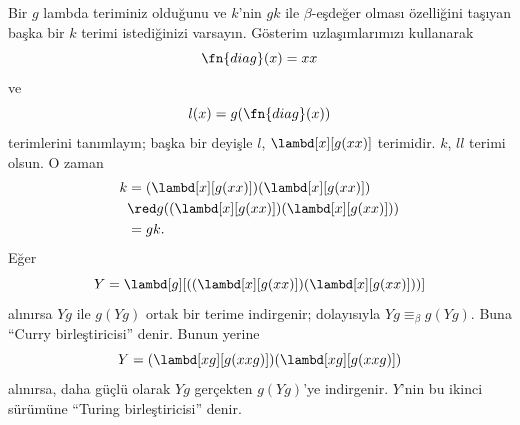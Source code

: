 


Bir $g$ lambda teriminiz olduğunu ve $k$'nin $gk$ ile $\beta$-eşdeğer olması
özelliğini taşıyan başka bir $k$ terimi istediğinizi varsayın. Gösterim
uzlaşımlarımızı kullanarak
\[
\fn{diag}(x) = xx
\]
ve
\[
l(x) = g(\fn{diag}(x))
\]
terimlerini tanımlayın; başka bir deyişle $l$,
$\lambd[x][g(xx)]$ terimidir. $k$, $ll$ terimi olsun. O zaman
\begin{align*}
k & = (\lambd[x][g(xx)])(\lambd[x][g(xx)]) \\
& \red  g((\lambd[x][g(xx)])(\lambd[x][g(xx)])) \\
& = gk.
\end{align*}
Eğer
\[
Y = \lambd[g][((\lambd[x][g(xx)])(\lambd[x][g(xx)]))]
\]
alınırsa $Yg$ ile $g(Yg)$ ortak bir terime indirgenir; dolayısıyla
$Yg\equiv_\beta g(Yg)$. Buna ``Curry birleştiricisi'' denir. Bunun yerine
\[
Y = (\lambd[xg][g(xxg)])(\lambd[xg][g(xxg)])
\]
alınırsa, daha güçlü olarak $Yg$ gerçekten $g(Yg)$'ye indirgenir. $Y$'nin
bu ikinci sürümüne ``Turing birleştiricisi'' denir.

